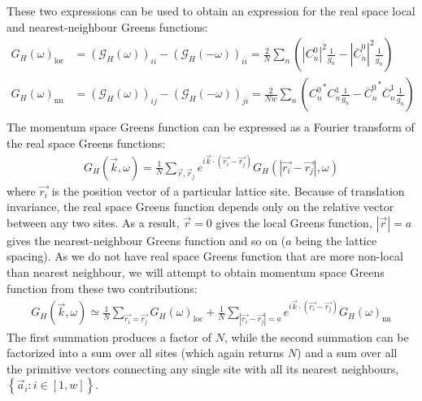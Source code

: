\documentclass[12pt]{article}
\numberwithin{equation}{section}
\begin{document}
These two expressions can be used to obtain an expression for the real space local and nearest-neighbour Greens functions:
\begin{equation}\begin{aligned}
	G_H(\omega)_\text{loc} &= \left(\mathcal{G}_H(\omega)\right)_{ii} - \left(\mathcal{G}_H(-\omega)\right)_{\overline{ii}} = \frac{2}{N}\sum_n\left(|C^0_{n}|^2 \frac{1}{g_n} - |\overline C^0_{n}|^2 \frac{1}{\overline{g_n}}\right)\\
	G_H(\omega)_\text{nn} &= \left(\mathcal{G}_H(\omega)\right)_{ij} - \left(\mathcal{G}_H(-\omega)\right)_{\overline{ji}} = \frac{2}{Nw}\sum_n\left({C^0_{n}}^* C^1_{n} \frac{1}{g_n} - {\overline C^0_{n}}^* \overline C^1_{n} \frac{1}{\overline{g_n}}\right)\\
\end{aligned}\end{equation}
The momentum space Greens function can be expressed as a Fourier transform of the real space Greens functions:
\begin{equation}\begin{aligned}
	G_H (\vec k, \omega) = \frac{1}{N}\sum_{\vec r, \vec r_j}e^{i \vec{k}\cdot\left(\vec{r_i} - \vec {r_j}\right)}G_H (|\vec{r_i} - \vec {r_j}|, \omega)
\end{aligned}\end{equation}
where $\vec{r_i}$ is the position vector of a particular lattice site. Because of translation invariance, the real space Greens function depends only on the relative vector between any two sites. As a result, $\vec r=0$ gives the local Greens function, $|\vec r|=a$ gives the nearest-neighbour Greens function and so on ($a$ being the lattice spacing). As we do not have real space Greens function that are more non-local than nearest neighbour, we will attempt to obtain momentum space Greens function from these two contributions:
\begin{equation}\begin{aligned}
	G_H (\vec k, \omega) \simeq \frac{1}{N}\sum_{\vec{r_i} = \vec {r_j}}G_H (\omega)_\text{loc} + \frac{1}{N}\sum_{|\vec{r_i} - \vec {r_j}|=a} e^{i \vec{k}\cdot\left(\vec{r_i} - \vec {r_j}\right)}G_H (\omega)_\text{nn}
\end{aligned}\end{equation}
The first summation produces a factor of $N$, while the second summation can be factorized into a sum over all sites (which again returns $N$) and a sum over all the primitive vectors connecting any single site with all its nearest neighbours, $\left\{ \vec a_i: i \in \left[1, w\right]\right\}$.
\end{document}
